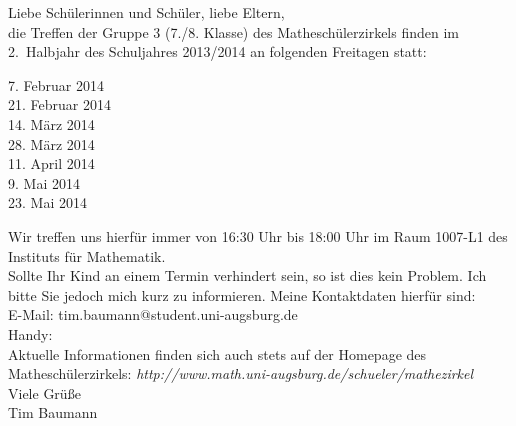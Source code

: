 \documentclass{infozettel}
\begin{document}
\renewcommand{\betreff}{Informationen zum Mathesch\"ulerzirkel der Universit\"at Augsburg\\ (7./8. Klasse -- Gruppe 3)}

\makeletterhead
Liebe Sch\"ulerinnen und Sch\"uler, liebe Eltern,\\[5pt]
die Treffen der Gruppe 3 (7./8. Klasse) des Mathesch\"ulerzirkels finden im 2.\ Halbjahr des Schuljahres 2013/2014 an folgenden Freitagen statt:
\begin{center}
7. Februar 2014\\
21. Februar 2014\\
14. März 2014\\
28. März 2014\\
11. April 2014\\
9. Mai 2014\\
23. Mai 2014
\end{center}
Wir treffen uns hierf\"ur immer von 16:30 Uhr bis 18:00 Uhr im Raum 1007-L1 des Instituts f\"ur Mathematik.\\

Sollte Ihr Kind an 
einem Termin verhindert sein, so ist dies kein Problem. Ich bitte Sie jedoch mich kurz zu informieren. Meine Kontaktdaten hierf\"ur sind:\\
E-Mail: tim.baumann@student.uni-augsburg.de\\
Handy: \\

Aktuelle Informationen finden sich auch stets auf der Homepage des Mathesch\"ulerzirkels:
\textsl{http:/\!/www.math.uni-augsburg.de/schueler/mathezirkel}\\

Viele Gr\"u\ss{}e\\[1.5cm]
Tim Baumann\\[1.1cm]
\end{document}
